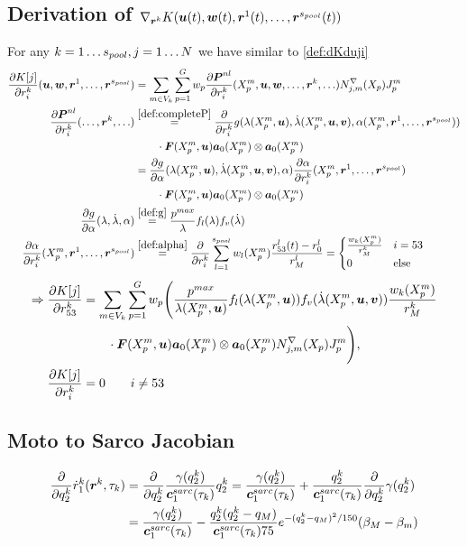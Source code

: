 \subsection{Derivation of $\nabla_{\boldsymbol{r}^k}K(\boldsymbol{u}(t),\boldsymbol{w}(t),\boldsymbol{r}^1(t),\ldots,\boldsymbol{r}^{s_{pool}}(t))$}
For any $k = 1\ldots{s_{pool}}, j=1\ldots N$ we have similar to \eqref{def:dKduji}
\begin{align}
	\d{K[j]}{r^k_i}(\vu,\vw,\vr^1,\ldots,\vr^\mups) &= \sumvk\sumgp w_p \d{\vPnl}{r^k_i}(\pmp,\vu,\vw,\ldots,\vr^k,\ldots) \dNjmp\jmp\\
	\d{\vPnl}{r^k_i}(\ldots,\vr^k,\ldots) & \re{def:completeP} \d{}{r^k_i} g(\la(\pmp,\vu),\dla(\pmp,\vu,\vv),\alpha(\pmp,\vr^1,\ldots,\vr^\mups))\nonumber\\
	&\qquad\cdot\vF(\pmp,\vu)\va_0(\pmp)\otimes\va_0(\pmp)\\
	&= \d{g}{\alpha}(\la(\pmp,\vu),\dla(\pmp,\vu,\vv),\alpha)\d{\alpha}{r^k_i}(\pmp,\vr^1,\ldots,\vr^\mups)\nonumber\\
	&\qquad\cdot\vF(\pmp,\vu)\va_0(\pmp)\otimes\va_0(\pmp)\\
	\d{g}{\alpha}(\la,\dla,\alpha) &\re{def:g} \frac{p^{max}}{\la}f_l(\la)f_v(\dla)\\
	\d{\alpha}{r^k_i}(\pmp,\vr^1,\ldots,\vr^\mups) &\re{def:alpha} \d{}{r^k_i}\sum\limits_{l=1}^\mups w_l(\pmp)\frac{r^l_{53}(t)-r^l_0}{r^l_M} = \begin{cases}
		\frac{w_k(\pmp)}{r^k_M} & i=53\\
		0 & \text{else}
	\end{cases}
\end{align}
\begin{align}	
	\Rightarrow\frac{\partial K[j]}{\partial r^k_{53}} &= \sum\limits_{m\in V_k}^{}\sum\limits_{p=1}^{G} w_p \Biggl(\frac{p^{max}}{\lambda(X^m_p,\boldsymbol{u})}f_l(\lambda(X^m_p,\boldsymbol{u}))f_v(\dot{\lambda}(X^m_p,\boldsymbol{u},\boldsymbol{v}))\frac{w_k(X^m_p)}{r^k_M}\nonumber\\
	&\qquad \cdot \boldsymbol{F}(X^m_p,\boldsymbol{u})\boldsymbol{a}_0(X^m_p)\otimes\boldsymbol{a}_0(X^m_p)N^\nabla_{j,m}(X_p)J^m_p\Biggr),\\
	\frac{\partial K[j]}{\partial r^k_i} &= 0 \qquad i \neq 53
\end{align}

\subsection{Moto to Sarco Jacobian}
\begin{align}
	\frac{\partial }{\partial q_2^k}\dot{r}_1^k(\boldsymbol{r}^k,\tau_k) &= \frac{\partial }{\partial q_2^k}\frac{\gamma(q_2^k)}{\boldsymbol{c}^{sarc}_1(\tau_k)}q_2^k = \frac{\gamma(q_2^k)}{\boldsymbol{c}^{sarc}_1(\tau_k)} + \frac{q_2^k}{\boldsymbol{c}^{sarc}_1(\tau_k)}\frac{\partial }{\partial q_2^k}\gamma(q_2^k)\\
	&=  \frac{\gamma(q_2^k)}{\boldsymbol{c}^{sarc}_1(\tau_k)} - \frac{q_2^k(q_2^k-q_M)}{\boldsymbol{c}^{sarc}_1(\tau_k)75}e^{-(q_2^k-q_M)^2/150}(\beta_M-\beta_m)
\end{align}

